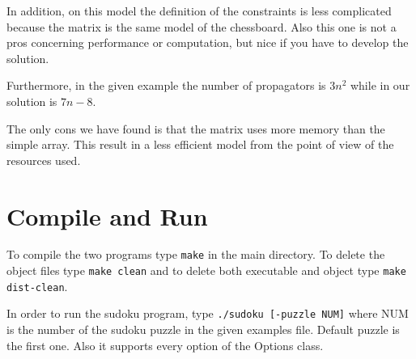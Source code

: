 \documentclass[a4paper, 11pt]{article}
\begin{document}
In addition, on this model the definition of the constraints is less complicated because the matrix is the same model of the chessboard. Also this one is not a pros concerning performance or computation, but nice if you have to develop the solution.

Furthermore, in the given example the number of propagators is $3n^{2}$ while in our solution is $7n-8$.

The only cons we have found is that the matrix uses more memory than the simple array. This result in a less efficient model from the point of view of the resources used.

\section{Compile and Run}

To compile the two programs type \texttt{make} in the main
directory. To delete the object files type \texttt{make clean} and to
delete both executable and object type \texttt{make dist-clean}.
	
In order to run the sudoku program, type \texttt{./sudoku [-puzzle
  NUM]} where NUM is the number of the sudoku puzzle in the given
examples file. Default puzzle is the first one. Also it supports every
option of the Options class.
\end{document}

